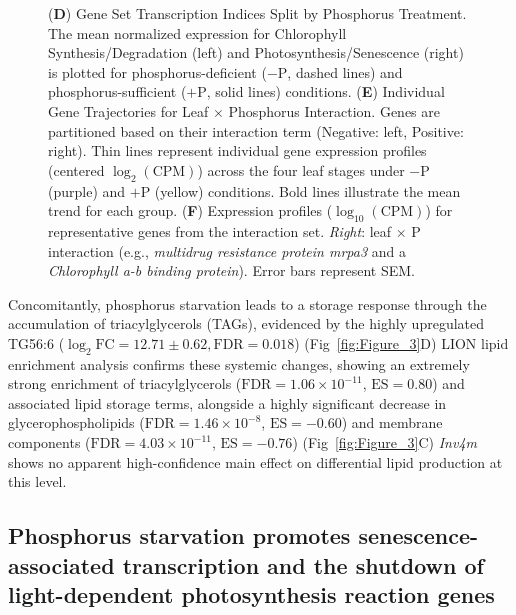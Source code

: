 \documentclass[9pt,twocolumn,twoside]{rilabRxiv}
\newcommand{\invfour}{\textit{Inv4m}\xspace}
\begin{document}
\begin{figure}[!ht]
{(\textbf{D}) Gene Set Transcription Indices Split by Phosphorus Treatment. The mean normalized expression for Chlorophyll Synthesis/Degradation (left) and Photosynthesis/Senescence (right) is plotted for phosphorus-deficient ($-\text{P}$, dashed lines) and phosphorus-sufficient ($+\text{P}$, solid lines) conditions. 
(\textbf{E}) Individual Gene Trajectories for Leaf $\times$ Phosphorus Interaction. Genes are partitioned based on their interaction term (Negative: left, Positive: right). Thin lines represent individual gene expression profiles (centered $\log_{2}(\text{CPM})$) across the four leaf stages under $-\text{P}$ (purple) and $+\text{P}$ (yellow) conditions. Bold lines illustrate the mean trend for each group.
(\textbf{F}) Expression profiles ($\log_{10}(\text{CPM})$) for representative genes from the interaction set. \textit{Right}: leaf $\times$ P interaction (e.g., \textit{multidrug resistance protein mrpa3} and a \textit{Chlorophyll a-b binding protein}). Error bars represent SEM.
}
\label{fig:Figure_5}
\end{figure}
Concomitantly, phosphorus starvation leads to a storage response through the accumulation of triacylglycerols (TAGs), evidenced by the highly upregulated TG56:6 ($\log_2\text{FC}=12.71 \pm 0.62, \text{FDR}=0.018$) (Fig~\ref{fig:Figure_3}D)
LION lipid enrichment analysis confirms these systemic changes, showing an extremely strong enrichment of triacylglycerols ($\text{FDR}=1.06 \times 10^{-11}$, $\text{ES}=0.80$) and associated lipid storage terms, alongside a highly significant decrease in glycerophospholipids ($\text{FDR}=1.46 \times 10^{-8}$, $\text{ES}=-0.60$) and membrane components ($\text{FDR}=4.03 \times 10^{-11}$, $\text{ES}=-0.76$) (Fig~\ref{fig:Figure_3}C)
\invfour shows no apparent high-confidence main effect on differential lipid production at this level.
\subsection*{Phosphorus starvation promotes senescence-associated  transcription and the shutdown of light-dependent photosynthesis reaction genes}
\end{document}
